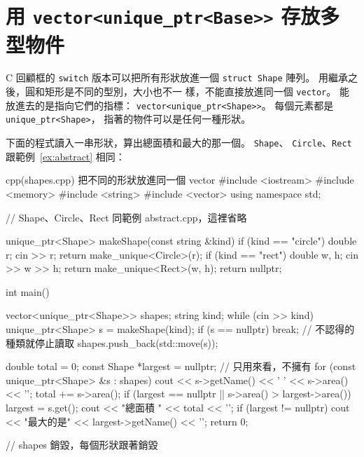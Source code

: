 \section{用 \texttt{vector<unique\_ptr<Base>>} 存放多型物件}
\label{sec:poly-container}

C 回顧框的 \texttt{switch} 版本可以把所有形狀放進一個
\texttt{struct Shape} 陣列。 用繼承之後，圓和矩形是不同的型別，大小也不一
樣，不能直接放進同一個 \texttt{vector}。 能放進去的是指向它們的指標：
\texttt{vector<unique\_ptr<Shape>>}。 每個元素都是 \texttt{unique\_ptr<Shape>}，
指著的物件可以是任何一種形狀。

下面的程式讀入一串形狀，算出總面積和最大的那一個。 \texttt{Shape}、
\texttt{Circle}、\texttt{Rect} 跟範例~\ref{ex:abstract} 相同：

\begin{example}[label=ex:poly-vector]{cpp}{(shapes.cpp) 把不同的形狀放進同一個 vector}
#include <iostream>
#include <memory>
#include <string>
#include <vector>
using namespace std;

// Shape、Circle、Rect 同範例 abstract.cpp，這裡省略

unique_ptr<Shape> makeShape(const string &kind) {
    if (kind == "circle") {
        double r;
        cin >> r;
        return make_unique<Circle>(r);
    }
    if (kind == "rect") {
        double w, h;
        cin >> w >> h;
        return make_unique<Rect>(w, h);
    }
    return nullptr;
}

int main() {
    vector<unique_ptr<Shape>> shapes;
    string kind;
    while (cin >> kind) {
        unique_ptr<Shape> s = makeShape(kind);
        if (s == nullptr) {
            break;                              // 不認得的種類就停止讀取
        }
        shapes.push_back(std::move(s));
    }

    double total = 0;
    const Shape *largest = nullptr;             // 只用來看，不擁有
    for (const unique_ptr<Shape> &s : shapes) {
        cout << s->getName() << ' ' << s->area() << '\n';
        total += s->area();
        if (largest == nullptr || s->area() > largest->area()) {
            largest = s.get();
        }
    }
    cout << "總面積 " << total << '\n';
    if (largest != nullptr) {
        cout << "最大的是" << largest->getName() << '\n';
    }
    return 0;
}                                               // shapes 銷毀，每個形狀跟著銷毀
\end{example}



